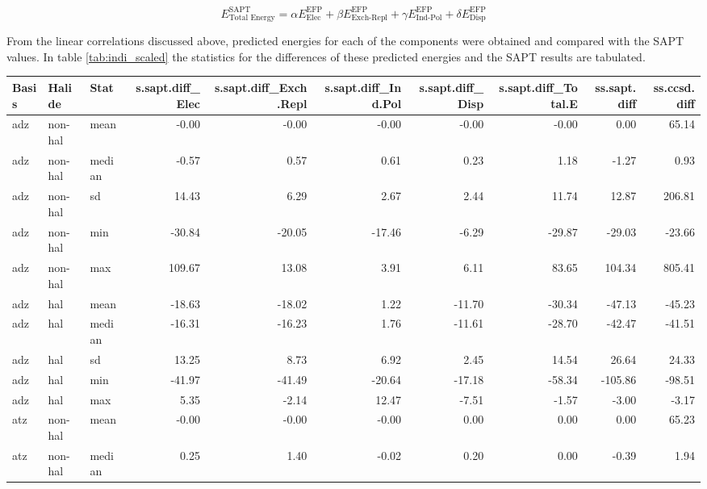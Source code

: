 \begin{equation}
    E^{\text{SAPT}}_{\text{Total Energy}} = \alpha E_{\text{Elec}}^{\text{EFP}} +
                                            \beta E_{\text{Exch-Repl}}^{\text{EFP}} +
                                            \gamma E_{\text{Ind-Pol}}^{\text{EFP}} +
                                            \delta E_{\text{Disp}}^{\text{EFP}}
\end{equation}

From the linear correlations discussed above, predicted energies for each of the components were obtained and compared with the SAPT values. 
In table 
\ref{tab:indi_scaled}
the statistics for the differences of these predicted energies and the SAPT results are tabulated. 

\begin{table}[ht]
\centering
\scriptsize
\begin{tabular}{lllrrrrrrr}
  \hline
Basis & Halide & Stat & s.sapt.diff\_Elec & s.sapt.diff\_Exch.Repl & s.sapt.diff\_Ind.Pol & s.sapt.diff\_Disp & s.sapt.diff\_Total.E & ss.sapt.diff & ss.ccsd.diff \\ 
  \hline
adz & non-hal & mean & -0.00 & -0.00 & -0.00 & -0.00 & -0.00 & 0.00 & 65.14 \\ 
  adz & non-hal & median & -0.57 & 0.57 & 0.61 & 0.23 & 1.18 & -1.27 & 0.93 \\ 
  adz & non-hal & sd & 14.43 & 6.29 & 2.67 & 2.44 & 11.74 & 12.87 & 206.81 \\ 
  adz & non-hal & min & -30.84 & -20.05 & -17.46 & -6.29 & -29.87 & -29.03 & -23.66 \\ 
  adz & non-hal & max & 109.67 & 13.08 & 3.91 & 6.11 & 83.65 & 104.34 & 805.41 \\ 
  adz & hal & mean & -18.63 & -18.02 & 1.22 & -11.70 & -30.34 & -47.13 & -45.23 \\ 
  adz & hal & median & -16.31 & -16.23 & 1.76 & -11.61 & -28.70 & -42.47 & -41.51 \\ 
  adz & hal & sd & 13.25 & 8.73 & 6.92 & 2.45 & 14.54 & 26.64 & 24.33 \\ 
  adz & hal & min & -41.97 & -41.49 & -20.64 & -17.18 & -58.34 & -105.86 & -98.51 \\ 
  adz & hal & max & 5.35 & -2.14 & 12.47 & -7.51 & -1.57 & -3.00 & -3.17 \\ 
  atz & non-hal & mean & -0.00 & -0.00 & -0.00 & 0.00 & 0.00 & 0.00 & 65.23 \\ 
  atz & non-hal & median & 0.25 & 1.40 & -0.02 & 0.20 & 0.00 & -0.39 & 1.94 \\ 

\end{tabular}
\end{table}
